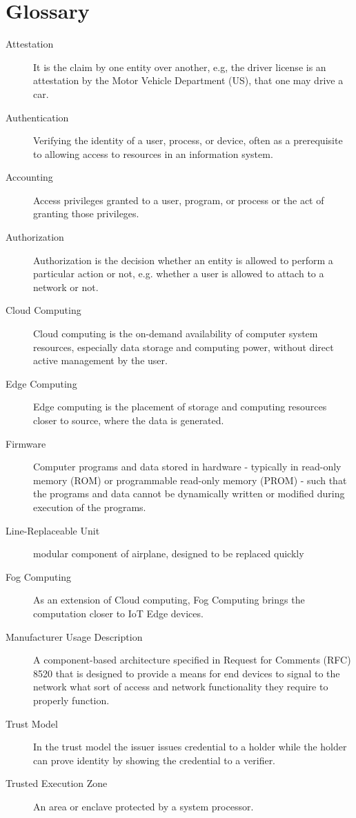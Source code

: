 \chapter*{Glossary}


\begin{description}
	\item [Attestation] It is the claim by one entity over another, e.g, the driver license is an attestation by the
	      Motor Vehicle Department (US), that one may drive a car. \cite{eth-decentralized-identity}
	\item [Authentication] Verifying the identity of a user, process, or device, often as a prerequisite to
	      allowing access to resources in an information system. \cite{nist:glossary}
	\item [Accounting] Access privileges granted to a user, program, or process or the act of granting those
	      privileges. \cite{nist:glossary}
	\item [Authorization] Authorization is the decision whether an entity is allowed to perform a particular action
	      or not, e.g. whether a user is allowed to attach to a network or not.
	\item [Cloud Computing] Cloud computing is the on-demand availability of computer system resources, especially
	      data storage and computing power, without direct active management by the user. \cite{nist:glossary}
	\item [Edge Computing] Edge computing is the placement of storage and computing resources closer to source, where
	      the data is generated. \cite{nist:glossary}
	\item [Firmware] Computer programs and data stored in hardware - typically in read-only memory (ROM) or
	      programmable read-only memory (PROM) - such that the programs and data cannot be dynamically written
	      or modified during execution of the programs. \cite{nist:glossary}
	\item [Line-Replaceable Unit] modular component of airplane, designed to be replaced quickly
	\item [Fog Computing] As an extension of Cloud computing, Fog Computing brings the computation closer to IoT
	      Edge devices. \cite{nist:glossary}
	\item [Manufacturer Usage Description] A component-based architecture specified in Request for Comments (RFC)
	      8520 that is designed to provide a means for end devices to signal to the network what sort of access and
	      network functionality they require to properly function. \cite{nist:glossary}
	\item [Trust Model] In the trust model the issuer issues credential to a holder while the holder can prove
	      identity by showing the credential to a verifier.
	\item [Trusted Execution Zone] An area or enclave protected by a system processor. \cite{nist:glossary}
\end{description}
